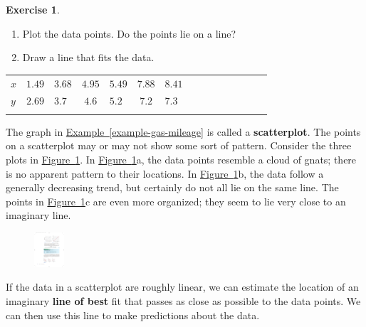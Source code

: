 \documentclass[10pt,]{book}
\newcommand{\terminology}[1]{\textbf{#1}}
\theoremstyle{plain}
\theoremstyle{definition}
\theoremstyle{definition}
\theoremstyle{definition}
\theoremstyle{definition}
\newtheorem{exercise}[theorem]{Exercise}
\numberwithin{equation}{section}
\newcommand{\hrulethin}  {\noalign{\hrule height 0.04em}}
\newcommand{\hrulethick} {\noalign{\hrule height 0.11em}}
\begin{document}
\begin{exercise}\label{exercise-scatterplot}
\leavevmode%
\begin{enumerate}[label=*\alph**]
\item\hypertarget{li-195}{}Plot the data points. Do the points lie on a line?\item\hypertarget{li-196}{}Draw a line that fits the data.\end{enumerate}
\leavevmode%
\begin{table}
\centering
\begin{tabular}{AcAcAcAcAcAcAcA}\hrulethick
\(x\)&\(1.49\)&\(3.68\)&\(4.95\)&\(5.49\)&\(7.88\)&\(8.41\)\tabularnewline\hrulethin
\(y\)&\(2.69\)&\(3.7\)&\(4.6\)&\(5.2\)&\(7.2\)&\(7.3\)\tabularnewline\hrulethin
\end{tabular}
\end{table}
\end{exercise}
\par

    The graph in \hyperref[example-gas-mileage]{Example~\ref{example-gas-mileage}} is called a \terminology{scatterplot}. The points on a scatterplot may or may not show some sort of pattern. Consider the three plots in \hyperref[fig-scatterplots]{Figure~\ref{fig-scatterplots}}. In \hyperref[fig-scatterplots]{Figure~\ref{fig-scatterplots}}a, the data points resemble a cloud of gnats; there is no apparent pattern to their locations. In \hyperref[fig-scatterplots]{Figure~\ref{fig-scatterplots}}b, the data follow a generally decreasing trend, but certainly do not all lie on the same line. The points in \hyperref[fig-scatterplots]{Figure~\ref{fig-scatterplots}}c are even more organized; they seem to lie very close to an imaginary line.
%
\leavevmode%
\begin{figure}
\centering
\includegraphics[width=0.100\textwidth,]{images/fig-scatterplots.pdf}\caption{\label{fig-scatterplots}}
\end{figure}
\par

    If the data in a scatterplot are roughly linear, we can estimate the location of an imaginary \terminology{line of best} fit that passes as close as possible to the data points. We can then use this line to make predictions about the data.%
\typeout{************************************************}
\typeout{************************************************}
\end{document}

